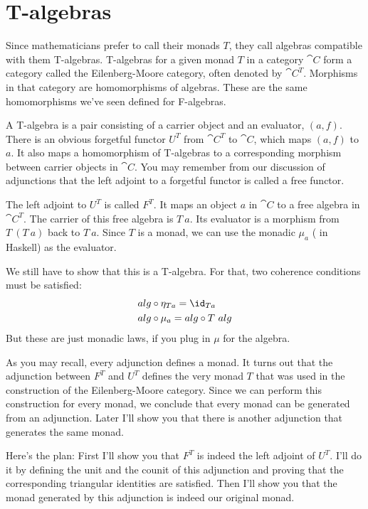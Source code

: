 \section{T-algebras}

Since mathematicians prefer to call their monads $T$, they call
algebras compatible with them T-algebras. T-algebras for a given monad $T$
in a category $\cat{C}$ form a category called the Eilenberg-Moore
category, often denoted by $\cat{C}^T$. Morphisms in that
category are homomorphisms of algebras. These are the same homomorphisms
we've seen defined for F-algebras.

A T-algebra is a pair consisting of a carrier object and an evaluator,
$(a, f)$. There is an obvious forgetful functor $U^T$ from
$\cat{C}^T$ to $\cat{C}$, which maps $(a, f)$ to $a$. It
also maps a homomorphism of T-algebras to a corresponding morphism
between carrier objects in $\cat{C}$. You may remember from our discussion of
adjunctions that the left adjoint to a forgetful functor is called a
free functor.

The left adjoint to $U^T$ is called $F^T$. It maps an object
$a$ in $\cat{C}$ to a free algebra in $\cat{C}^T$. The carrier
of this free algebra is $T\ a$. Its evaluator is a morphism from
$T\ (T\ a)$ back to $T\ a$. Since $T$ is a monad,
we can use the monadic $\mu_a$ ( in Haskell) as the
evaluator.

We still have to show that this is a T-algebra. For that, two coherence
conditions must be satisfied:
\begin{align*}
alg &\circ \eta_{Ta} = \id_{Ta} \\
alg &\circ \mu_a = alg \circ T\ alg
\end{align*}
But these are just monadic laws, if you plug in $\mu$ for the
algebra.

As you may recall, every adjunction defines a monad. It turns out that
the adjunction between $F^T$ and $U^T$
defines the very monad $T$ that was used in the construction of
the Eilenberg-Moore category. Since we can perform this construction for
every monad, we conclude that every monad can be generated from an
adjunction. Later I'll show you that there is another adjunction that
generates the same monad.

Here's the plan: First I'll show you that $F^T$ is indeed the left
adjoint of $U^T$. I'll do it by defining the unit and the counit
of this adjunction and proving that the corresponding triangular
identities are satisfied. Then I'll show you that the monad generated by
this adjunction is indeed our original monad.

